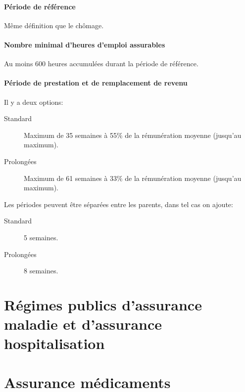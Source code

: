 \documentclass[10pt, french]{article}
\begin{document}
\begin{multicols*}{3}
\begin{definitionNOHFILL}
\paragraph{Période de référence}
Même définition que le chômage.

\paragraph{Nombre minimal d'heures d'emploi assurables}
Au moins 600 heures accumulées durant la période de référence.

\paragraph{Période de prestation et de remplacement de revenu}
Il y a deux options:
\begin{description}
	\item[Standard]	Maximum de 35 semaines à 55\% de la rémunération moyenne (jusqu'au maximum).
	\item[Prolongées]	Maximum de 61 semaines à 33\% de la rémunération moyenne (jusqu'au maximum).
\end{description}

Les périodes peuvent être séparées entre les parents, dans tel cas on ajoute:
\begin{description}
	\item[Standard]	5 semaines.
	\item[Prolongées]	8 semaines.
\end{description}
\end{definitionNOHFILL}

\newpage

\section{Régimes publics d'assurance maladie et d'assurance hospitalisation}

\newpage

\section{Assurance médicaments}


\end{multicols*}
\end{document}
